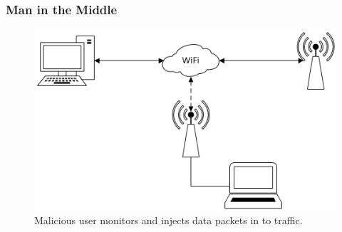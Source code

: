 \subsubsection{Man in the Middle}
\begin{figure}[h!]
\includegraphics[width=\linewidth]{research/figures/mitm.png}
\caption{Malicious user monitors and injects data packets in to traffic.}
\end{figure}